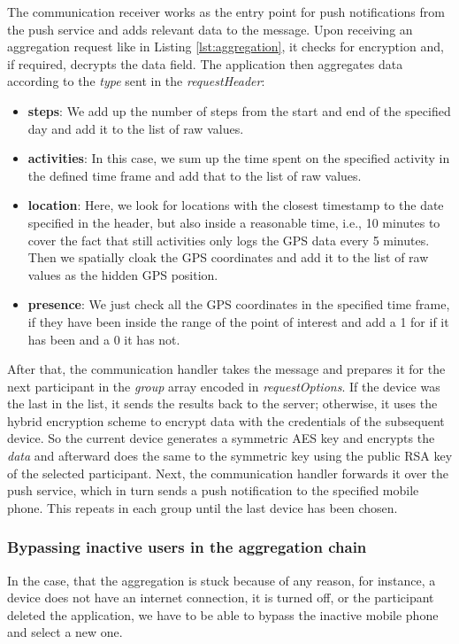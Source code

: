 The communication receiver works as the entry point for push notifications from the push service and adds relevant data to the message. Upon receiving an aggregation request like in Listing \ref{lst:aggregation}, it checks for encryption and, if required, decrypts the data field. The application then aggregates data according to the \textit{type} sent in the \textit{requestHeader}:
\begin{itemize}
    \item \textbf{steps}: We add up the number of steps from the start and end of the specified day and add it to the list of raw values.
    \item \textbf{activities}: In this case, we sum up the time spent on the specified activity in the defined time frame and add that to the list of raw values.
    \item \textbf{location}: Here, we look for locations with the closest timestamp to the date specified in the header, but also inside a reasonable time, i.e., 10 minutes to cover the fact that still activities only logs the GPS data every 5 minutes. Then we spatially cloak the GPS coordinates and add it to the list of raw values as the hidden GPS position.
    \item \textbf{presence}: We just check all the GPS coordinates in the specified time frame, if they have been inside the range of the point of interest and add a 1 for if it has been and a 0 it has not.
\end{itemize}

After that, the communication handler takes the message and prepares it for the next participant in the \textit{group} array encoded in \textit{requestOptions}. If the device was the last in the list, it sends the results back to the server; otherwise, it uses the hybrid encryption scheme to encrypt data with the credentials of the subsequent device. So the current device generates a symmetric AES key and encrypts the \textit{data} and afterward does the same to the symmetric key using the public RSA key of the selected participant. Next, the communication handler forwards it over the push service, which in turn sends a push notification to the specified mobile phone. This repeats in each group until the last device has been chosen.

\subsubsection{Bypassing inactive users in the aggregation chain}
In the case, that the aggregation is stuck because of any reason, for instance, a device does not have an internet connection, it is turned off, or the participant deleted the application, we have to be able to bypass the inactive mobile phone and select a new one.

